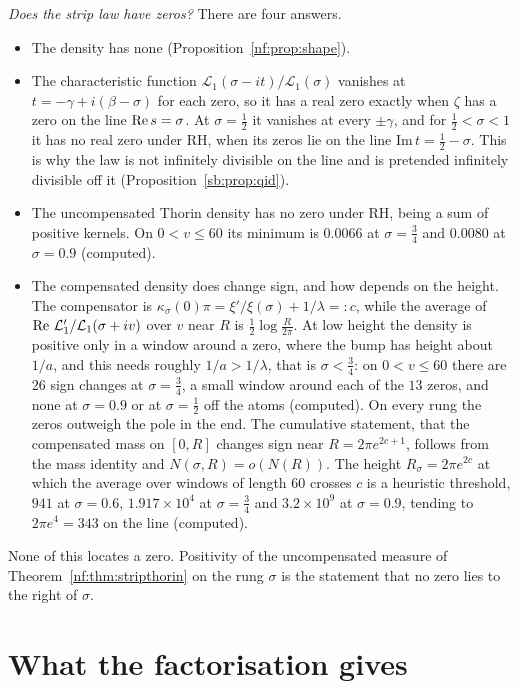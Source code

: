 \medskip\noindent\emph{Does the strip law have zeros?} There are four answers.
\begin{itemize}
\item The density has none (Proposition~\ref{nf:prop:shape}).
\item The characteristic function $\mathcal L_1(\sigma-it)/\mathcal L_1(\sigma)$ vanishes at $t=-\gamma+i(\beta-\sigma)$ for each zero, so it has a real zero exactly when $\zeta$ has a zero on the line $\operatorname{Re} s=\sigma$. At $\sigma=\frac12$ it vanishes at every $\pm\gamma$, and for $\frac12<\sigma<1$ it has no real zero under RH, when its zeros lie on the line $\mathrm{Im}\,t=\frac12-\sigma$. This is why the law is not infinitely divisible on the line and is pretended infinitely divisible off it (Proposition~\ref{sb:prop:qid}).
\item The uncompensated Thorin density has no zero under RH, being a sum of positive kernels. On $0<v\le60$ its minimum is $0.0066$ at $\sigma=\frac34$ and $0.0080$ at $\sigma=0.9$ (computed).
\item The compensated density does change sign, and how depends on the height. The compensator is $\kappa_\sigma(0)\pi=\xi'/\xi(\sigma)+1/\lambda=:c$, while the average of $\operatorname{Re}\,\mathcal L_1'/\mathcal L_1(\sigma+iv)$ over $v$ near $R$ is $\frac12\log\frac R{2\pi}$. At low height the density is positive only in a window around a zero, where the bump has height about $1/a$, and this needs roughly $1/a>1/\lambda$, that is $\sigma<\frac34$: on $0<v\le60$ there are $26$ sign changes at $\sigma=\frac34$, a small window around each of the $13$ zeros, and none at $\sigma=0.9$ or at $\sigma=\frac12$ off the atoms (computed). On every rung the zeros outweigh the pole in the end. The cumulative statement, that the compensated mass on $[0,R]$ changes sign near $R=2\pi e^{2c+1}$, follows from the mass identity and $N(\sigma,R)=o(N(R))$. The height $R_\sigma=2\pi e^{2c}$ at which the average over windows of length $60$ crosses $c$ is a heuristic threshold, $941$ at $\sigma=0.6$, $1.917\times10^4$ at $\sigma=\frac34$ and $3.2\times10^9$ at $\sigma=0.9$, tending to $2\pi e^4=343$ on the line (computed).
\end{itemize}
None of this locates a zero. Positivity of the uncompensated measure of Theorem~\ref{nf:thm:stripthorin} on the rung $\sigma$ is the statement that no zero lies to the right of $\sigma$.

\section{What the factorisation gives}\label{nf:sec:gives}

